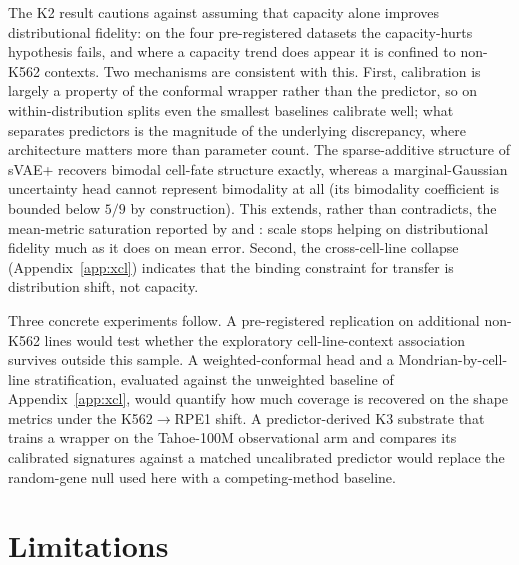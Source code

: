 \documentclass{article}
\begin{document}
The K2 result cautions against assuming that capacity alone improves distributional fidelity: on the four pre-registered datasets the capacity-hurts hypothesis fails, and where a capacity trend does appear it is confined to non-K562 contexts. Two mechanisms are consistent with this. First, calibration is largely a property of the conformal wrapper rather than the predictor, so on within-distribution splits even the smallest baselines calibrate well; what separates predictors is the magnitude of the underlying discrepancy, where architecture matters more than parameter count. The sparse-additive structure of sVAE+ recovers bimodal cell-fate structure exactly, whereas a marginal-Gaussian uncertainty head cannot represent bimodality at all (its bimodality coefficient is bounded below $5/9$ by construction). This extends, rather than contradicts, the mean-metric saturation reported by \citet{ahlmann2025} and \citet{csendes2025}: scale stops helping on distributional fidelity much as it does on mean error. Second, the cross-cell-line collapse (Appendix~\ref{app:xcl}) indicates that the binding constraint for transfer is distribution shift, not capacity.

Three concrete experiments follow. A pre-registered replication on additional non-K562 lines would test whether the exploratory cell-line-context association survives outside this sample. A weighted-conformal head and a Mondrian-by-cell-line stratification, evaluated against the unweighted baseline of Appendix~\ref{app:xcl}, would quantify how much coverage is recovered on the shape metrics under the K562$\rightarrow$RPE1 shift. A predictor-derived K3 substrate that trains a wrapper on the Tahoe-100M observational arm and compares its calibrated signatures against a matched uncalibrated predictor would replace the random-gene null used here with a competing-method baseline.

\section{Limitations}
\end{document}
